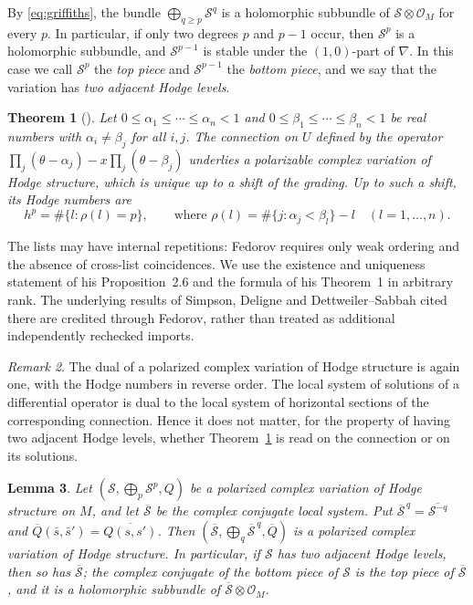 \documentclass[11pt]{amsart}
\newtheorem{theorem}{Theorem}[section]
\newtheorem{lemma}[theorem]{Lemma}
\theoremstyle{definition}
\theoremstyle{remark}
\newtheorem{remark}[theorem]{Remark}
\numberwithin{equation}{section}
\newcommand{\cS}{\mathcal{S}}
\newcommand{\cO}{\mathcal{O}}
\begin{document}
By \eqref{eq:griffiths}, the bundle $\bigoplus_{q\ge p}\cS^q$ is a holomorphic subbundle of $\cS\otimes\cO_M$ for every $p$. In particular, if only two degrees $p$ and $p-1$ occur, then $\cS^p$ is a holomorphic subbundle, and $\cS^{p-1}$ is stable under the $(1,0)$-part of $\nabla$. In this case we call $\cS^p$ the \emph{top piece} and $\cS^{p-1}$ the \emph{bottom piece}, and we say that the variation has \emph{two adjacent Hodge levels}.

\begin{theorem}[{\citet[Proposition~2.6 and Theorem~1]{Fedorov2018}}]\label{thm:fedorov}
Let $0\le\alpha_1\le\cdots\le\alpha_n<1$ and $0\le\beta_1\le\cdots\le\beta_n<1$ be real numbers with $\alpha_i\ne\beta_j$ for all $i,j$. The connection on $U$ defined by the operator $\prod_j(\theta-\alpha_j)-x\prod_j(\theta-\beta_j)$ underlies a polarizable complex variation of Hodge structure, which is unique up to a shift of the grading. Up to such a shift, its Hodge numbers are
\[
h^p=\#\{l:\rho(l)=p\},\qquad\text{where }\rho(l)=\#\{j:\alpha_j<\beta_l\}-l\quad(l=1,\dots,n).
\]
\end{theorem}

The lists may have internal repetitions: Fedorov requires only weak ordering and the absence of cross-list coincidences. We use the existence and uniqueness statement of his Proposition~2.6 and the formula of his Theorem~1 in arbitrary rank. The underlying results of Simpson, Deligne and Dettweiler--Sabbah cited there are credited through Fedorov, rather than treated as additional independently rechecked imports.


\begin{remark}\label{rem:dual}
The dual of a polarized complex variation of Hodge structure is again one, with the Hodge numbers in reverse order. The local system of solutions of a differential operator is dual to the local system of horizontal sections of the corresponding connection. Hence it does not matter, for the property of having two adjacent Hodge levels, whether Theorem~\ref{thm:fedorov} is read on the connection or on its solutions.
\end{remark}

\begin{lemma}\label{lem:conj}
Let $(\cS,\bigoplus_p\cS^p,Q)$ be a polarized complex variation of Hodge structure on $M$, and let $\overline{\cS}$ be the complex conjugate local system. Put $\overline{\cS}^{\,q}=\overline{\cS^{-q}}$ and $\overline Q(\bar s,\bar s')=\overline{Q(s,s')}$. Then $(\overline{\cS},\bigoplus_q\overline{\cS}^{\,q},\overline Q)$ is a polarized complex variation of Hodge structure. In particular, if $\cS$ has two adjacent Hodge levels, then so has $\overline{\cS}$; the complex conjugate of the bottom piece of $\cS$ is the top piece of $\overline{\cS}$, and it is a holomorphic subbundle of $\overline{\cS}\otimes\cO_M$.
\end{lemma}
\end{document}
